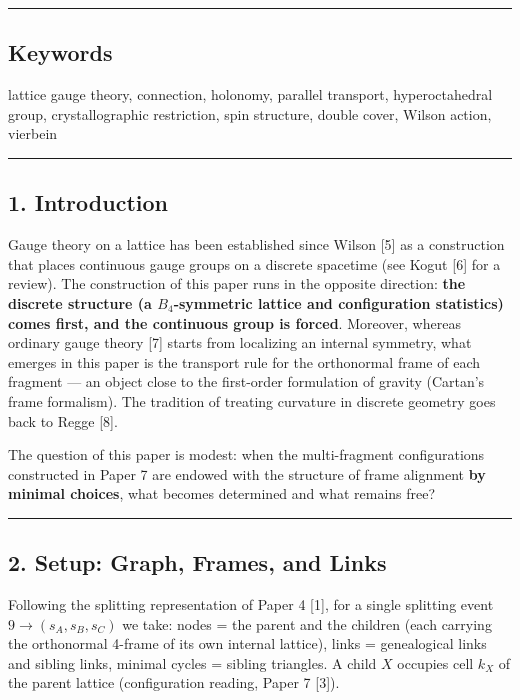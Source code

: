 \documentclass[
]{ltjsarticle}
\begin{document}
\begin{center}\rule{0.5\linewidth}{0.5pt}\end{center}

\subsection{Keywords}\label{keywords}

lattice gauge theory, connection, holonomy, parallel transport,
hyperoctahedral group, crystallographic restriction, spin structure,
double cover, Wilson action, vierbein

\begin{center}\rule{0.5\linewidth}{0.5pt}\end{center}

\subsection{1. Introduction}\label{introduction}

Gauge theory on a lattice has been established since Wilson {[}5{]} as a
construction that places continuous gauge groups on a discrete spacetime
(see Kogut {[}6{]} for a review). The construction of this paper runs in
the opposite direction: \textbf{the discrete structure (a
\(B_4\)-symmetric lattice and configuration statistics) comes first, and
the continuous group is forced}. Moreover, whereas ordinary gauge theory
{[}7{]} starts from localizing an internal symmetry, what emerges in
this paper is the transport rule for the orthonormal frame of each
fragment --- an object close to the first-order formulation of gravity
(Cartan's frame formalism). The tradition of treating curvature in
discrete geometry goes back to Regge {[}8{]}.

The question of this paper is modest: when the multi-fragment
configurations constructed in Paper 7 are endowed with the structure of
frame alignment \textbf{by minimal choices}, what becomes determined and
what remains free?

\begin{center}\rule{0.5\linewidth}{0.5pt}\end{center}

\subsection{2. Setup: Graph, Frames, and
Links}\label{setup-graph-frames-and-links}

Following the splitting representation of Paper 4 {[}1{]}, for a single
splitting event \(9\to(s_A,s_B,s_C)\) we take: nodes = the parent and
the children (each carrying the orthonormal 4-frame of its own internal
lattice), links = genealogical links and sibling links, minimal cycles =
sibling triangles. A child \(X\) occupies cell \(k_X\) of the parent
lattice (configuration reading, Paper 7 {[}3{]}).
\end{document}
